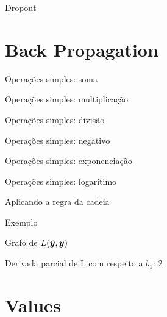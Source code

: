 \documentclass[10pt]{beamer}
\begin{document}
\begin{frame}[fragile]{Dropout}

\end{frame}

\section{Back Propagation}

\begin{frame}{Operações simples: soma}

\end{frame}

\begin{frame}{Operações simples: multiplicação}

\end{frame}

\begin{frame}{Operações simples: divisão}

\end{frame}

\begin{frame}{Operações simples: negativo}

\end{frame}

\begin{frame}{Operações simples: exponenciação}

\end{frame}

\begin{frame}{Operações simples: logarítimo}

\end{frame}

\begin{frame}{Aplicando a regra da cadeia}

\end{frame}


\begin{frame}{Exemplo}

\end{frame}

\begin{frame}{Grafo de $L(\hat{\bm{y}}, \bm{y})$}

\end{frame}

\begin{frame}{Derivada parcial de L com respeito a $b_1$: 2}

\end{frame}

\section{Values}
\end{document}
